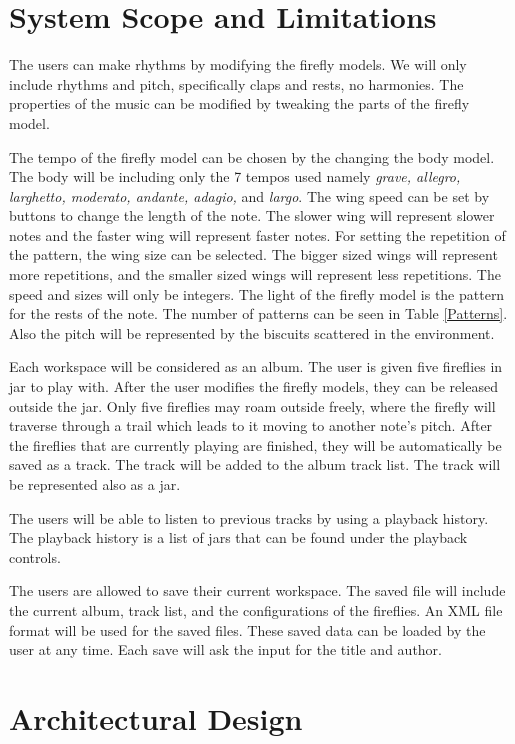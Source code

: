 \section{System Scope and Limitations}
The users can make rhythms by modifying the firefly models. We will only include rhythms and pitch, specifically claps and rests, no harmonies. The properties of the music can be modified by tweaking the parts of the firefly model.

The tempo of the firefly model can be chosen by the changing the body model. The body will be including only the 7 tempos used namely \textit{grave, allegro, larghetto, moderato, andante, adagio,} and \textit{largo}. The wing speed can be set by buttons to change the length of the note. The slower wing will represent slower notes and the faster wing will represent faster notes. For setting the repetition of the pattern, the wing size can be selected. The bigger sized wings will represent more repetitions, and the smaller sized wings will represent less repetitions. The speed and sizes will only be integers. The light of the firefly model is the pattern for the rests of the note. The number of patterns can be seen in Table \ref{Patterns}. Also the pitch will be represented by the biscuits scattered in the environment. 

Each workspace will be considered as an album. The user is given five fireflies in jar to play with. After the user modifies the firefly models, they can be released outside the jar. Only five fireflies may roam outside freely, where the firefly will traverse through a trail which leads to it moving to another note's pitch. After the fireflies that are currently playing are finished, they will be automatically be saved as a track. The track will be added to the album track list. The track will be represented also as a jar.

The users will be able to listen to previous tracks by using a playback history. The playback history is a list of jars that can be found under the playback controls.  

The users are allowed to save their current workspace. The saved file will include the current album, track list, and the configurations of the fireflies. An XML file format will be used for the saved files. These saved data can be loaded by the user at any time. Each save will ask the input for the title and author.

\section{Architectural Design}

